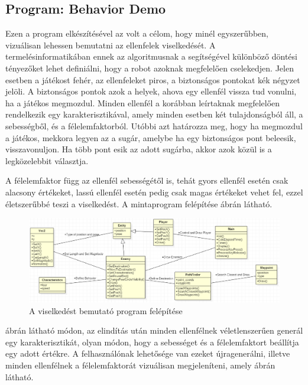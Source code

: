 \subsection{Program: Behavior Demo}

Ezen a program elkészítésével az volt a célom, hogy minél egyszerűbben, vizuálisan lehessen bemutatni az ellenfelek viselkedését. A termelésinformatikában ennek az algoritmusnak a segítségével különböző döntési tényezőket lehet definiálni, hogy a robot azoknak megfelelően cselekedjen. Jelen esetben a játékost fehér, az ellenfeleket piros, a biztonságos pontokat kék négyzet jelöli. A biztonságos pontok azok a helyek, ahova egy ellenfél vissza tud vonulni, ha a játékos megmozdul. Minden ellenfél a korábban leírtaknak megfelelően rendelkezik egy karakterisztikával, amely minden esetben két tulajdonságból áll, a sebességből, és a félelemfaktorból. Utóbbi azt határozza meg, hogy ha megmozdul a játékos, mekkora legyen az a sugár, amelybe ha egy biztonságos pont beleesik, visszavonuljon. Ha több pont esik az adott sugárba, akkor azok közül is a legközelebbit választja.

A félelemfaktor függ az ellenfél sebességétől is, tehát gyors ellenfél esetén csak alacsony értékeket, lassú ellenfél esetén pedig csak magas értékeket vehet fel, ezzel életszerűbbé teszi a viselkedést. A mintaprogram felépítése  ábrán látható.

\begin{figure}[h]
\centering
\includegraphics[scale=0.5]{kepek/behavior_uml.png}
\caption{A viselkedést bemutató program felépítése}
\label{fig:behavior_uml}
\end{figure}

 ábrán látható módon, az elindítás után minden ellenfélnek véletlenszerűen generál egy karakterisztikát, olyan módon, hogy a sebességet és a félelemfaktort beállítja egy adott értékre. A felhasználónak lehetősége van ezeket újragenerálni, illetve minden ellenfélnek a félelemfaktorát vizuálisan megjeleníteni, amely  ábrán látható.

